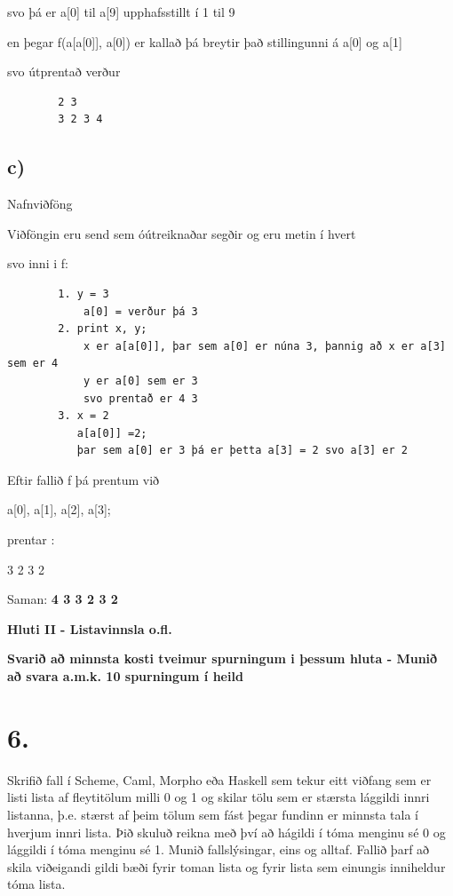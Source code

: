 \documentclass{article}
\newcommand{\bo}[1]{\textbf{#1}}
\begin{document}
     svo þá er a[0] til a[9] upphafsstillt í 1 til 9

     en þegar f(a[a[0]], a[0]) er kallað þá breytir það stillingunni á a[0] og a[1]

     svo útprentað verður

     \begin{verbatim}
        2 3
        3 2 3 4
     \end{verbatim}


      


     \subsection{c)} Nafnviðföng


     Viðföngin eru send sem óútreiknaðar segðir og eru metin í hvert 

     svo inni i f:

     \begin{verbatim}
        1. y = 3
            a[0] = verður þá 3
        2. print x, y;
            x er a[a[0]], þar sem a[0] er núna 3, þannig að x er a[3] sem er 4
            y er a[0] sem er 3
            svo prentað er 4 3
        3. x = 2
           a[a[0]] =2;
           þar sem a[0] er 3 þá er þetta a[3] = 2 svo a[3] er 2
     \end{verbatim}

     Eftir fallið f þá prentum við 
     
     a[0], a[1], a[2], a[3];
     
     prentar :

     3 2 3 2


     Saman: 
     \bo{ 4 3 3 2 3 2}
     \newpage

     \begin{center}
        \textbf{Hluti II - Listavinnsla o.fl.}


        \textbf{Svarið að minnsta kosti tveimur spurningum i þessum hluta - Munið að svara a.m.k. 10 spurningum í heild}
     \end{center}

     \section{6.}
     Skrifið fall í Scheme, Caml, Morpho eða Haskell sem tekur eitt viðfang sem er listi lista af fleytitölum milli 0 og 1 og skilar tölu sem 
     er stærsta lággildi innri listanna, þ.e. stærst af þeim tölum sem fást 
     þegar fundinn er minnsta tala í hverjum innri lista. Þið skuluð reikna
     með því að hágildi í tóma menginu sé 0 og lággildi í tóma menginu sé 1.
     Munið fallslýsingar, eins og alltaf. Fallið þarf að skila viðeigandi 
     gildi bæði fyrir toman lista og fyrir lista sem einungis inniheldur tóma lista.
\end{document}
